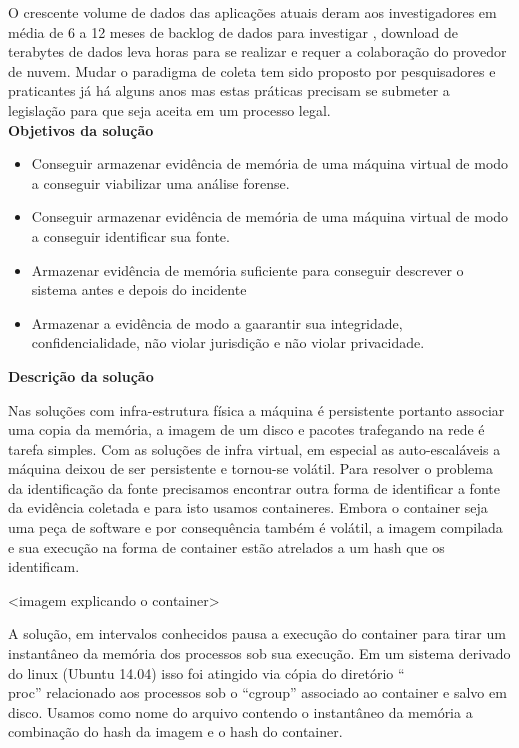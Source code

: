 \documentclass[
	12pt,				%
	openright,			%
	oneside,			%
	a4paper,			%
	english,			%
	french,				%
	spanish,			%
	brazil,				%
	]{abntex2}
\begin{document}
O crescente volume de dados das aplicações atuais deram aos investigadores em média de 6 a 12 meses de backlog de dados para investigar \cite{Quick2014}, download de terabytes
de dados leva horas para se realizar e requer a colaboração do provedor de nuvem. Mudar o paradigma de coleta tem sido proposto por pesquisadores e praticantes já há alguns
anos \cite{Birk2011}\cite{Sang2013} mas estas práticas precisam se submeter a legislação para que seja aceita em um processo legal.\\

\textbf{Objetivos da solução}

\begin{itemize}
 \item Conseguir armazenar evidência de memória de uma máquina virtual de modo a conseguir viabilizar uma análise forense.
 \item Conseguir armazenar evidência de memória de uma máquina virtual de modo a conseguir identificar sua fonte.
 \item Armazenar evidência de memória suficiente para conseguir descrever o sistema antes e depois do incidente
 \item Armazenar a evidência de modo a gaarantir sua integridade, confidencialidade, não violar jurisdição e não violar privacidade.\\
\end{itemize}

\textbf{Descrição da solução}

Nas soluções com infra-estrutura física a máquina é persistente portanto associar uma copia da memória, a imagem de um disco e pacotes trafegando na rede é tarefa simples.
Com as soluções de infra virtual, em especial as auto-escaláveis a máquina deixou de ser persistente e tornou-se volátil. Para resolver o problema da identificação da fonte
precisamos encontrar outra forma de identificar a fonte da evidência coletada e para isto usamos containeres. Embora o container seja uma peça de software e por consequência
também é volátil, a imagem compilada e sua execução na forma de container estão atrelados a um hash que os identificam. 

<imagem explicando o container>

A solução, em intervalos conhecidos pausa a execução
do container para tirar um instantâneo da memória dos processos sob sua execução. Em um sistema derivado do linux (Ubuntu 14.04) isso foi atingido via cópia do diretório
``\\proc'' relacionado aos processos sob o ``cgroup'' associado ao container e salvo em disco. Usamos como nome do arquivo contendo o instantâneo da memória a combinação 
do hash da imagem e o hash do container.
\end{document}
